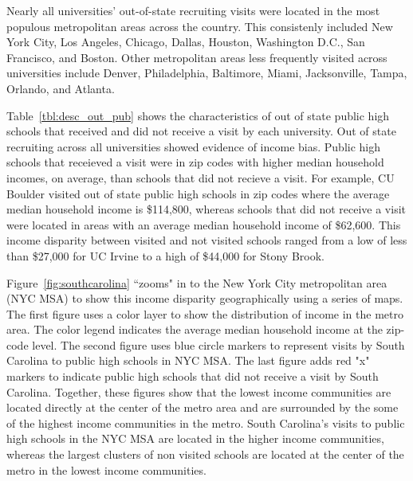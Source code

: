 \documentclass[twoside]{article}
\begin{document}

Nearly all universities' out-of-state recruiting visits were located in the most populous metropolitan areas across the country. This consistenly included New York City, Los Angeles, Chicago, Dallas, Houston, Washington D.C., San Francisco, and Boston. Other metropolitan areas less frequently visited across universities include Denver, Philadelphia, Baltimore, Miami, Jacksonville, Tampa, Orlando, and Atlanta. 

Table~\ref{tbl:desc_out_pub} shows the characteristics of out of state public high schools that received and did not receive a visit by each university. Out of state recruiting across all universities showed evidence of income bias. Public high schools that receieved a visit were in zip codes with higher median household incomes, on average, than schools that did not recieve a visit. For example, CU Boulder visited out of state public high schools in zip codes where the average median household income is \$114,800, whereas schools that did not receive a visit were located in areas with an average median household income of \$62,600. This income disparity between visited and not visited schools ranged from a low of less than \$27,000 for UC Irvine to a high of \$44,000 for Stony Brook.

Figure~\ref{fig:southcarolina} ``zooms" in to the New York City metropolitan area (NYC MSA) to show this income disparity geographically using a series of maps. The first figure uses a color layer to show the distribution of income in the metro area. The color legend indicates the average median household income at the zip-code level. The second figure uses blue circle markers to represent visits by South Carolina to public high schools in NYC MSA. The last figure adds red "x" markers to indicate public high schools that did not receive a visit by South Carolina. Together, these figures show that the lowest income communities are located directly at the center of the metro area and are surrounded by the some of the highest income communities in the metro. South Carolina's visits to public high schools in the NYC MSA are located in the higher income communities, whereas the largest clusters of non visited schools are located at the center of the metro in the lowest income communities.
\end{document}
